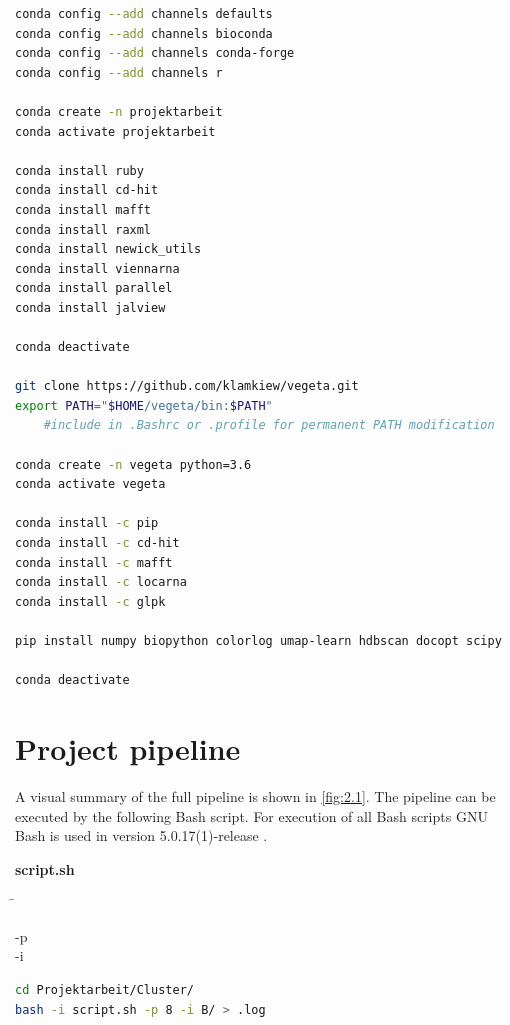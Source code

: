     \begin{lstlisting}[language=sh]
conda config --add channels defaults
conda config --add channels bioconda
conda config --add channels conda-forge
conda config --add channels r

conda create -n projektarbeit
conda activate projektarbeit

conda install ruby
conda install cd-hit
conda install mafft
conda install raxml
conda install newick_utils
conda install viennarna
conda install parallel
conda install jalview

conda deactivate

git clone https://github.com/klamkiew/vegeta.git
export PATH="$HOME/vegeta/bin:$PATH" 
    #include in .Bashrc or .profile for permanent PATH modification 

conda create -n vegeta python=3.6
conda activate vegeta

conda install -c pip
conda install -c cd-hit
conda install -c mafft
conda install -c locarna
conda install -c glpk

pip install numpy biopython colorlog umap-learn hdbscan docopt scipy

conda deactivate \end{lstlisting}  

\section{Project pipeline} \label{sec:2.2}
    
    A visual summary of the full pipeline is shown in \autoref{fig:2.1}. The pipeline can be executed by the following Bash script. For execution of all Bash scripts GNU Bash is used in version 5.0.17(1)-release \autocite{Bash}.
    
    \begin{leftbar}
        \textbf{script.sh}
        \begin{nstabbing}
            \qquad \= \kill
        
            -p \\
            
            -i 
        \end{nstabbing}
    \end{leftbar}

    \begin{lstlisting}[language=sh]
cd Projektarbeit/Cluster/
bash -i script.sh -p 8 -i B/ > .log\end{lstlisting}
    
